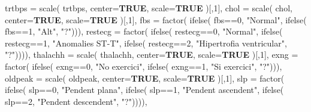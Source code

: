 \documentclass[
]{article}
\newenvironment{Shaded}{\begin{snugshade}}{\end{snugshade}}
\newcommand{\AttributeTok}[1]{\textcolor[rgb]{0.80,0.80,0.80}{#1}}
\newcommand{\ConstantTok}[1]{\textcolor[rgb]{0.86,0.64,0.64}{\textbf{#1}}}
\newcommand{\DecValTok}[1]{\textcolor[rgb]{0.86,0.86,0.80}{#1}}
\newcommand{\FunctionTok}[1]{\textcolor[rgb]{0.94,0.94,0.56}{#1}}
\newcommand{\NormalTok}[1]{\textcolor[rgb]{0.80,0.80,0.80}{#1}}
\newcommand{\SpecialCharTok}[1]{\textcolor[rgb]{0.86,0.64,0.64}{#1}}
\newcommand{\StringTok}[1]{\textcolor[rgb]{0.80,0.58,0.58}{#1}}
\begin{document}
\begin{Shaded}
\begin{Highlighting}[]
          \AttributeTok{trtbps =} \FunctionTok{scale}\NormalTok{( trtbps, }\AttributeTok{center=}\ConstantTok{TRUE}\NormalTok{, }\AttributeTok{scale=}\ConstantTok{TRUE}\NormalTok{ )[,}\DecValTok{1}\NormalTok{],}
          \AttributeTok{chol =} \FunctionTok{scale}\NormalTok{( chol, }\AttributeTok{center=}\ConstantTok{TRUE}\NormalTok{, }\AttributeTok{scale=}\ConstantTok{TRUE}\NormalTok{ )[,}\DecValTok{1}\NormalTok{],}
          \AttributeTok{fbs =} \FunctionTok{factor}\NormalTok{( }\FunctionTok{ifelse}\NormalTok{( fbs}\SpecialCharTok{==}\DecValTok{0}\NormalTok{, }\StringTok{"Normal"}\NormalTok{,}
                          \FunctionTok{ifelse}\NormalTok{( fbs}\SpecialCharTok{==}\DecValTok{1}\NormalTok{, }\StringTok{"Alt"}\NormalTok{, }\StringTok{"?"}\NormalTok{))),}
          \AttributeTok{restecg =} \FunctionTok{factor}\NormalTok{( }\FunctionTok{ifelse}\NormalTok{( restecg}\SpecialCharTok{==}\DecValTok{0}\NormalTok{, }\StringTok{"Normal"}\NormalTok{,}
                            \FunctionTok{ifelse}\NormalTok{( restecg}\SpecialCharTok{==}\DecValTok{1}\NormalTok{, }\StringTok{"Anomalies ST{-}T"}\NormalTok{,}
                            \FunctionTok{ifelse}\NormalTok{( restecg}\SpecialCharTok{==}\DecValTok{2}\NormalTok{, }\StringTok{"Hipertrofia ventricular"}\NormalTok{, }\StringTok{"?"}\NormalTok{)))),}
          \AttributeTok{thalachh =} \FunctionTok{scale}\NormalTok{( thalachh, }\AttributeTok{center=}\ConstantTok{TRUE}\NormalTok{, }\AttributeTok{scale=}\ConstantTok{TRUE}\NormalTok{ )[,}\DecValTok{1}\NormalTok{],}
          \AttributeTok{exng =} \FunctionTok{factor}\NormalTok{( }\FunctionTok{ifelse}\NormalTok{( exng}\SpecialCharTok{==}\DecValTok{0}\NormalTok{, }\StringTok{"No exercici"}\NormalTok{,}
                         \FunctionTok{ifelse}\NormalTok{( exng}\SpecialCharTok{==}\DecValTok{1}\NormalTok{, }\StringTok{"Si exercici"}\NormalTok{, }\StringTok{"?"}\NormalTok{))),}
          \AttributeTok{oldpeak =} \FunctionTok{scale}\NormalTok{( oldpeak, }\AttributeTok{center=}\ConstantTok{TRUE}\NormalTok{, }\AttributeTok{scale=}\ConstantTok{TRUE}\NormalTok{ )[,}\DecValTok{1}\NormalTok{],}
          \AttributeTok{slp =} \FunctionTok{factor}\NormalTok{( }\FunctionTok{ifelse}\NormalTok{( slp}\SpecialCharTok{==}\DecValTok{0}\NormalTok{, }\StringTok{"Pendent plana"}\NormalTok{,}
                        \FunctionTok{ifelse}\NormalTok{( slp}\SpecialCharTok{==}\DecValTok{1}\NormalTok{, }\StringTok{"Pendent ascendent"}\NormalTok{,}
                        \FunctionTok{ifelse}\NormalTok{( slp}\SpecialCharTok{==}\DecValTok{2}\NormalTok{, }\StringTok{"Pendent descendent"}\NormalTok{, }\StringTok{"?"}\NormalTok{)))),}

\end{Highlighting}
\end{Shaded}
\end{document}
